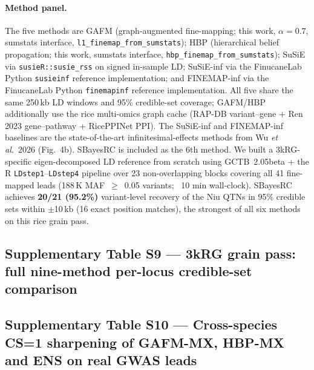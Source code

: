 \paragraph{Method panel.} The five methods are GAFM (graph-augmented
fine-mapping; this work, $\alpha{=}0.7$, sumstats interface,
\texttt{l1\_finemap\_from\_sumstats}); HBP (hierarchical belief
propagation; this work, sumstats interface,
\texttt{hbp\_finemap\_from\_sumstats}); SuSiE
\cite{wang2020simple} via \texttt{susieR::susie\_rss} on signed
in-sample LD; SuSiE-inf \cite{cui2024improving} via the
FinucaneLab Python \texttt{susieinf} reference implementation; and
FINEMAP-inf \cite{cui2024improving} via the FinucaneLab Python
\texttt{finemapinf} reference implementation. All five share the
same 250\,kb LD windows and 95\% credible-set coverage; GAFM/HBP
additionally use the rice multi-omics graph cache (RAP-DB
variant--gene + Ren 2023 gene--pathway + RicePPINet PPI). The
SuSiE-inf and FINEMAP-inf baselines are the state-of-the-art
infinitesimal-effects methods from Wu \emph{et al.}\ 2026 (Fig.~4b).
SBayesRC \cite{zheng2024leveraging} is included as the 6th method.
We built a 3kRG-specific eigen-decomposed LD reference from scratch
using GCTB\cite{zeng2018gctb}~2.05beta + the R \texttt{LDstep1}--\texttt{LDstep4}
pipeline over 23 non-overlapping blocks covering all 41 fine-mapped
leads (188\,K MAF~$\geq$~0.05 variants; ~10 min wall-clock).
SBayesRC achieves \textbf{20/21 (95.2\%)} variant-level recovery
of the Niu QTNs in 95\% credible sets within $\pm$10\,kb (16 exact
position matches), the strongest of all six methods on this rice
grain pass.

\clearpage

\subsection*{Supplementary Table S9 --- 3kRG grain pass: full nine-method per-locus credible-set comparison}



\clearpage

\subsection*{Supplementary Table S10 --- Cross-species CS=1 sharpening of GAFM-MX, HBP-MX and ENS on real GWAS leads}

